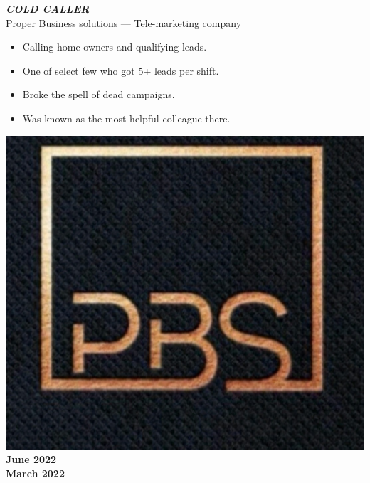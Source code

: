 \documentclass[10pt]{article}
\newcommand{\fancy}[1]{\Large\textbf{\textit{#1}}}
\begin{document}
\vspace{3em}


\noindent
\vspace{2em}
\begin{minipage}{0.7\textwidth}
 \fancy{COLD CALLER} \\
	{\large \href{https://www.linkedin.com/company/proper-business-solutions}{Proper Business solutions} --- Tele-marketing company} \\
\begin{itemize}
    \item Calling home owners and qualifying leads.
    \item One of select few who got 5+ leads per shift.
    \item Broke the spell of dead campaigns.
    \item Was known as the most helpful colleague there.
\end{itemize}   
\end{minipage}
\hspace{30pt}
\begin{minipage}{0.2\textwidth}
\begin{center}
\vspace{15pt}
\includegraphics[width=\textwidth]{pbs_lowquality_coldcalling.jpg} \\
    \large\textbf{June 2022\\March 2022}
\end{center}
\end{minipage}
\end{document}
